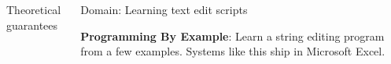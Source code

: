 \documentclass[final]{beamer}
\newlength{\onecolwid}
\newlength{\twocolwid}
\begin{document}
\begin{frame}[t]
\begin{columns}[t]
\begin{column}{\twocolwid}
\begin{columns}[t,totalwidth=\twocolwid]
\begin{column}{\onecolwid}
\begin{block}{Theoretical guarantees}
  \end{block}


\end{column} %

\begin{column}{\onecolwid}\vspace{-.6in} %


\begin{block}{Domain: Learning text edit scripts}

  \textbf{Programming By Example}: Learn a string editing program from a few examples. Systems like this ship in Microsoft Excel. 

  \vspace{1cm}
  

\end{block}
\end{column}
\end{columns}
\end{column}
\end{columns}
\end{frame}
\end{document}
